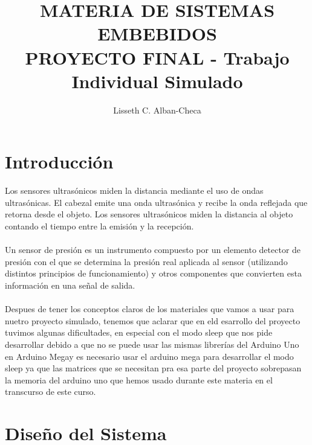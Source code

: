 \documentclass[10pt,a4paper]{article}
\begin{document}
\author{Lisseth C. Alban-Checa} %
\title{MATERIA DE SISTEMAS EMBEBIDOS\\ %
PROYECTO FINAL - Trabajo Individual Simulado}
\maketitle  
\section{Introducción} %
\begin{multicols}{2} %
Los sensores ultrasónicos miden la distancia mediante el uso de ondas ultrasónicas. El cabezal emite una onda ultrasónica y recibe la onda reflejada que retorna desde el objeto. Los sensores ultrasónicos miden la distancia al objeto contando el tiempo entre la emisión y la recepción.\\
\\Un sensor de presión es un instrumento compuesto por un elemento detector de presión con el que se determina la presión real aplicada al sensor (utilizando distintos principios de funcionamiento) y otros componentes que convierten esta información en una señal de salida. \\
\\Despues de tener los conceptos claros de los materiales que vamos a usar para nuetro proyecto simulado, tenemos que aclarar que en eld esarrollo del proyecto tuvimos algunas dificultades, en especial con el modo sleep que nos pide desarrollar debido a que no se puede usar las mismas librerías del Arduino Uno en Arduino Megay es necesario usar el arduino mega para desarrollar el modo sleep ya que las matrices que se necesitan pra esa parte del proyecto sobrepasan la memoria del arduino uno que hemos usado durante este materia en el transcurso de este curso.
\end{multicols} %
\section{Diseño del Sistema}
\end{document}
